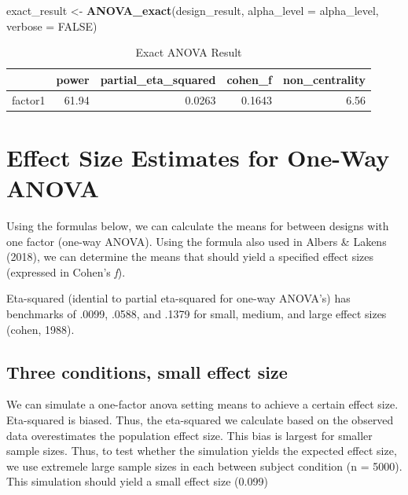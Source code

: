 \documentclass[]{book}
\newenvironment{Shaded}{\begin{snugshade}}{\end{snugshade}}
\newcommand{\DataTypeTok}[1]{\textcolor[rgb]{0.13,0.29,0.53}{#1}}
\newcommand{\KeywordTok}[1]{\textcolor[rgb]{0.13,0.29,0.53}{\textbf{#1}}}
\newcommand{\NormalTok}[1]{#1}
\newcommand{\OtherTok}[1]{\textcolor[rgb]{0.56,0.35,0.01}{#1}}
\newcommand{\StringTok}[1]{\textcolor[rgb]{0.31,0.60,0.02}{#1}}
\begin{document}
\begin{Shaded}
\begin{Highlighting}[]
\NormalTok{exact_result <-}\StringTok{ }\KeywordTok{ANOVA_exact}\NormalTok{(design_result,}
                            \DataTypeTok{alpha_level =}\NormalTok{ alpha_level,}
                            \DataTypeTok{verbose =} \OtherTok{FALSE}\NormalTok{)}
\end{Highlighting}
\end{Shaded}

\begin{table}[!h]

\caption{\label{tab:unnamed-chunk-77}Exact ANOVA Result}
\centering
\begin{tabular}{l|r|r|r|r}
\hline
  & power & partial\_eta\_squared & cohen\_f & non\_centrality\\
\hline
factor1 & 61.94 & 0.0263 & 0.1643 & 6.56\\
\hline
\end{tabular}
\end{table}

\hypertarget{effect-size-estimates-for-one-way-anova}{%
\section{Effect Size Estimates for One-Way ANOVA}\label{effect-size-estimates-for-one-way-anova}}

Using the formulas below, we can calculate the means for between designs with one factor (one-way ANOVA). Using the formula also used in Albers \& Lakens (2018), we can determine the means that should yield a specified effect sizes (expressed in Cohen's \emph{f}).

Eta-squared (idential to partial eta-squared for one-way ANOVA's) has benchmarks of .0099, .0588, and .1379 for small, medium, and large effect sizes (cohen, 1988).

\hypertarget{three-conditions-small-effect-size}{%
\subsection{Three conditions, small effect size}\label{three-conditions-small-effect-size}}

We can simulate a one-factor anova setting means to achieve a certain effect size. Eta-squared is biased. Thus, the eta-squared we calculate based on the observed data overestimates the population effect size. This bias is largest for smaller sample sizes. Thus, to test whether the simulation yields the expected effect size, we use extremele large sample sizes in each between subject condition (n = 5000). This simulation should yield a small effect size (0.099)
\end{document}
